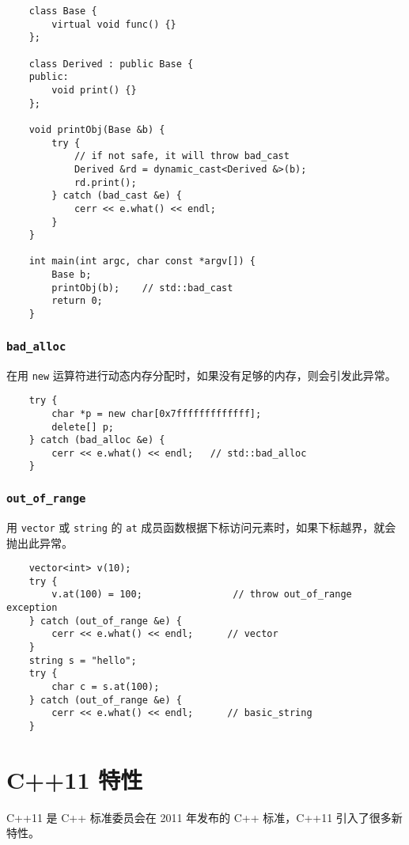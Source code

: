 \documentclass[UTF8]{ctexart}
\begin{document}
\begin{verbatim}
    class Base {
        virtual void func() {}
    };

    class Derived : public Base {
    public:
        void print() {}
    };

    void printObj(Base &b) {
        try {
            // if not safe, it will throw bad_cast
            Derived &rd = dynamic_cast<Derived &>(b);
            rd.print();
        } catch (bad_cast &e) {
            cerr << e.what() << endl;
        }
    }

    int main(int argc, char const *argv[]) {
        Base b;
        printObj(b);    // std::bad_cast
        return 0;
    }
\end{verbatim}

\subsubsection{\texttt{bad\_alloc}}
在用 \texttt{new} 运算符进行动态内存分配时，如果没有足够的内存，则会引发此异常。

\begin{verbatim}
    try {
        char *p = new char[0x7fffffffffffff];
        delete[] p;
    } catch (bad_alloc &e) {
        cerr << e.what() << endl;   // std::bad_alloc
    }
\end{verbatim}

\subsubsection{\texttt{out\_of\_range}}
用 \texttt{vector} 或 \texttt{string} 的 \texttt{at} 成员函数根据下标访问元素时，如果下标越界，就会抛出此异常。

\begin{verbatim}
    vector<int> v(10);
    try {
        v.at(100) = 100;                // throw out_of_range exception
    } catch (out_of_range &e) {
        cerr << e.what() << endl;      // vector
    }
    string s = "hello";
    try {
        char c = s.at(100);
    } catch (out_of_range &e) {
        cerr << e.what() << endl;      // basic_string
    }
\end{verbatim}

\section{C++11 特性}
C++11 是 C++ 标准委员会在 2011 年发布的 C++ 标准，C++11 引入了很多新特性。
\end{document}
